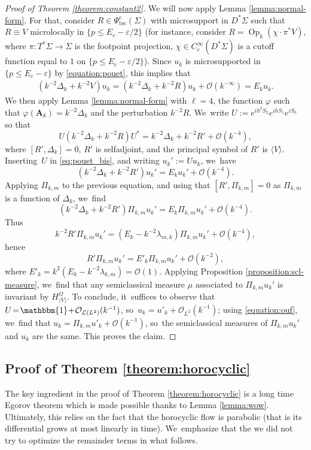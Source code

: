 \documentclass[10pt]{amsart}
\newcommand{\bA}{\boldsymbol{A}}
\theoremstyle{plain}
\theoremstyle{definition}
\let\mc\mathcal
\let\eps\varepsilon
\DeclareMathOperator{\comp}{c}
\DeclareMathOperator{\Op}{Op}
\begin{document}
\begin{proof}[Proof of Theorem \ref{theorem:constant2}]
We will now apply Lemma \ref{lemma:normal-form}. For that, consider $R \in \Psi^{\comp}_{\mathrm{tsc}}(\Sigma)$ with microsupport in $D^*\Sigma$ such that $R \equiv V$ microlocally in $\{p \leq E_c-\eps/2\}$ (for instance, consider $R = \Op_k(\chi \cdot \pi^*V)$, where $\pi : T^*\Sigma \to \Sigma$ is the footpoint projection, $\chi \in C^\infty_{\comp}(D^*\Sigma)$ is a cutoff function equal to $1$ on $\{p \leq E_c-\eps/2\}$). Since $u_k$ is microsupported in $\{p \leq E_c-\eps\}$ by \eqref{equation:pouet}, this implies that
\begin{gather} \label{eq:pouet_bis}
(k^{-2}\Delta_k + k^{-2}V) u_k = (k^{-2}\Delta_k + k^{-2}R) u_k +
\mc{O}(k^{-\infty}) = E_k u_k.
\end{gather}
We then apply Lemma \ref{lemma:normal-form} with $\ell=4$, the function $\varphi$ such that $\varphi(\bA_k) = k^{-2}\Delta_k$ and the perturbation $k^{-2}R$. We~write
$U :=
e^{ih^2S_2}e^{ihS_1}e^{iS_0}$ so that
\[
U(k^{-2}\Delta_k + k^{-2}R)U^* = k^{-2}
\Delta_k + k^{-2}R' + \mc{O}(k^{-4}),
\]
where $[R', \Delta_k]=0$, $R'$ is
selfadjoint, and the principal symbol of $R'$ is $\langle V \rangle$.
Inserting~$U$ in \eqref{eq:pouet_bis}, and writing $u_k' := U u_k$, we~have
\[
(k^{-2} \Delta_k + k^{-2}R') u_k' = E_k u_k' + \mc{O} (k^{-4}).
\]
Applying $\Pi_{k,m}$ to the previous equation, and using that $[R',\Pi_{k,m}] = 0$ as $\Pi_{k,m}$ is a function of $\Delta_k$, we~find
\[
(k^{-2} \Delta_k + k^{-2}R') \Pi_{k,m} u_k' = E_k \Pi_{k,m} u_k' + \mc{O}
(k^{-4}).
\]
Thus
\[
k^{-2}R' \Pi_{k,m} u_k' = (E_k - k^{-2} \lambda_{m,k}) \Pi_{k,m} u_k' + \mc{O}
(k^{-4}),
\]
hence
\[
R' \Pi_{k,m}u_k' = E'_k \Pi_{k,m} u_k' + \mc{O} (k^{-2}),
\]
where $E'_k = k^{2} (E_k - k^{-2} \lambda_{k,m}) = \mc{O}(1)$.
Applying Proposition \ref{proposition:scl-measure}, we~find that any semiclassical measure $\mu$ associated to $\Pi_{k,m} u_k'$ is invariant by $H^{\Omega}_{\langle V \rangle}$. To conclude, it~suffices to observe that~\hbox{$U \!=\! \mathbbm{1} \!+\! \mc{O}_{\mc{L}(L^2)}(k^{-1})$}, so~$u_k = u'_k + \mc{O}_{L^2}(k^{-1})$; using \eqref{equation:ouf}, we~find that $u_k = \Pi_{k,m} u'_k +\mc{O}(k^{-1})$, so~the semiclassical measures of $\Pi_{k,m} u_k'$ and $u_k$ are the same. This proves the claim.
\end{proof}

\subsection{Proof of Theorem \ref{theorem:horocyclic}} The key ingredient in the proof of Theorem \ref{theorem:horocyclic} is a long time Egorov theorem which is made possible thanks to Lemma \ref{lemma:wow}. Ultimately, this relies on the fact that the horocyclic flow is parabolic (that is its differential grows at most linearly in time). We~emphasize that the we did not try to optimize the remainder terms in what follows.
\end{document}
